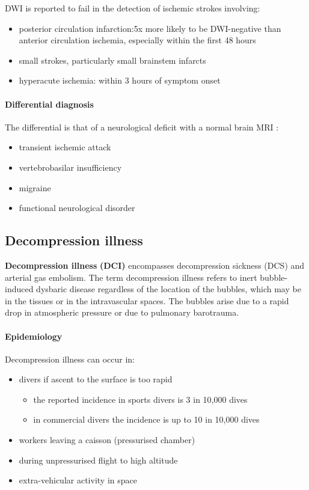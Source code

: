 DWI is reported to fail in the detection of ischemic strokes involving:

\begin{itemize}
	\tightlist
	\item
	posterior circulation infarction:5x more likely to be DWI-negative than anterior circulation ischemia, especially within the first 48 hours 
	\item
	small strokes, particularly small brainstem infarcts 
	\item
	hyperacute ischemia: within 3 hours of symptom onset 
\end{itemize}

\paragraph{Differential diagnosis}

The differential is that of a neurological deficit with a normal brain MRI :

\begin{itemize}
	\tightlist
	\item
	transient ischemic attack
	\item
	vertebrobasilar insufficiency
	\item
	migraine
	\item
	functional neurological disorder
\end{itemize}

\subsection{Decompression illness}

\textbf{Decompression illness} \textbf{(DCI)} encompasses decompression sickness (DCS) and arterial gas embolism. The term decompression illness refers to inert bubble-induced dysbaric disease regardless of the location of the bubbles, which may be in the tissues or in the intravascular spaces. The bubbles arise due to a rapid drop in atmospheric pressure or due to pulmonary barotrauma.

\paragraph{Epidemiology}

Decompression illness can occur in:

\begin{itemize}
	\item
	divers if ascent to the surface is too rapid
	
	\begin{itemize}
		\item
		the reported incidence in sports divers is 3 in 10,000 dives
		\item
		in commercial divers the incidence is up to 10 in 10,000 dives
	\end{itemize}
	\item
	workers leaving a caisson (pressurised chamber)
	\item
	during unpressurised flight to high altitude
	\item
	extra-vehicular activity in space
\end{itemize}

